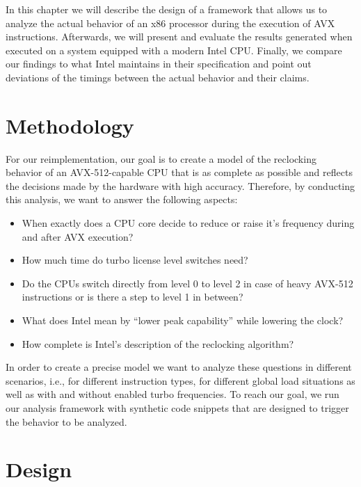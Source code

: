 In this chapter we will describe the design of a framework that allows us to analyze the actual behavior of an x86 processor during the execution of \gls{AVX} instructions. Afterwards, we will present and evaluate the results generated when executed on a system equipped with a modern Intel \gls{CPU}. Finally, we compare our findings to what Intel maintains in their specification and point out deviations of the timings between the actual behavior and their claims.

\section{Methodology}
\label{sec:analysis:methodology}

For our reimplementation, our goal is to create a model of the reclocking behavior of an \gls{AVX-512}-capable \gls{CPU} that is as complete as possible and reflects the decisions made by the hardware with high accuracy. Therefore, by conducting this analysis, we want to answer the following aspects:

\begin{itemize}
	\item When exactly does a \gls{CPU} core decide to reduce or raise it's frequency during and after \gls{AVX} execution?
	\item How much time do turbo license level switches need?
	\item Do the \glspl{CPU} switch directly from level 0 to level 2 in case of heavy \gls{AVX-512} instructions or is there a step to level 1 in between?
	\item What does Intel mean by \enquote{lower peak capability} while lowering the clock?
	\item How complete is Intel's description of the reclocking algorithm?
\end{itemize}

In order to create a precise model we want to analyze these questions in different scenarios, i.e., for different instruction types, for different global load situations as well as with and without enabled turbo frequencies. To reach our goal, we run our analysis framework with synthetic code snippets that are designed to trigger the behavior to be analyzed.

\section{Design}
\label{sec:analysis:design}

